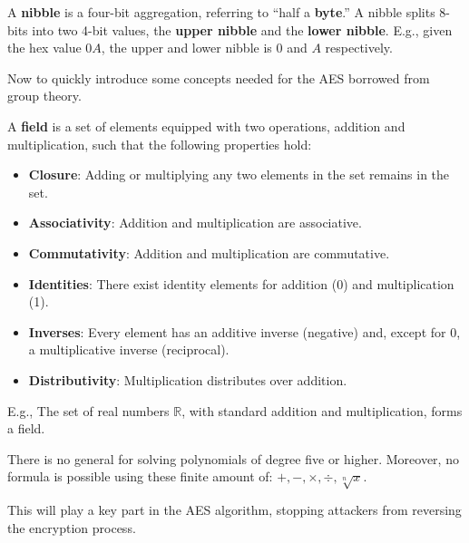 \newpage
\noindent
\begin{Def}[Nibble]

    \label{theo:nibble}
    A \textbf{nibble} is a four-bit aggregation, referring to ``half a \textbf{byte}.'' A nibble splits 8-bits into two 4-bit values,
    the \textbf{upper nibble} and the \textbf{lower nibble}. E.g., given the hex value $0A$,
    the upper and lower nibble is $0$ and $A$ respectively.
\end{Def}
Now to quickly introduce some concepts needed for the AES borrowed from group theory.
\begin{Def}[Field]

    \label{def:field}
    A \textbf{field} is a set of elements equipped with two operations, addition and multiplication, such that the following properties hold:
    \begin{itemize}
        \item \textbf{Closure}: Adding or multiplying any two elements in the set remains in the set.
        \item \textbf{Associativity}: Addition and multiplication are associative.
        \item \textbf{Commutativity}: Addition and multiplication are commutative.
        \item \textbf{Identities}: There exist identity elements for addition (0) and multiplication (1).
        \item \textbf{Inverses}: Every element has an additive inverse (negative) and, except for 0, a multiplicative inverse (reciprocal).
        \item \textbf{Distributivity}: Multiplication distributes over addition.
    \end{itemize}

    \noindent
    E.g., The set of real numbers $\mathbb{R}$, with standard addition and multiplication, forms a field.
\end{Def}
\begin{theo}

    \label{theo:abel_ruffini}
    There is no general for solving polynomials of degree five or higher. Moreover,
    no formula is possible using these finite amount of: $+,-,\times,\div,\sqrt[n]{x}$.
\end{theo}

\noindent
This will play a key part in the AES algorithm, stopping attackers from reversing the encryption process.

\newpage

